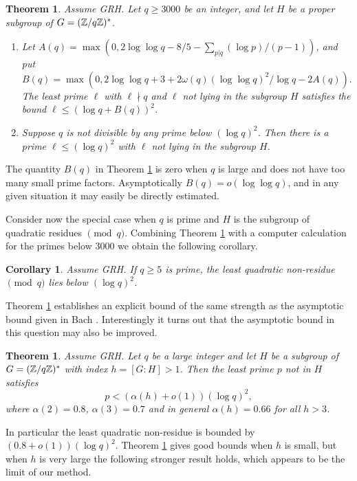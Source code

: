 \documentclass [12pt]{amsart}
\newtheorem{Theorem}[thm]{Theorem}
\newtheorem{corol}{Corollary}[section]
\numberwithin{equation}{section}
\begin{document}
 \begin{Theorem}\label{thmexplicit}
Assume GRH. Let $q\geq 3000$ be an integer, and let $H$ be a proper 
subgroup of $G=({\Bbb Z}/q{\Bbb Z})^*$.
\begin{enumerate}
\item Let $A(q) = \max(0, 2\log \log q -8/5 - \sum_{p|q} (\log p)/(p-1))$, and 
put $$B(q) = \max(0, 2\log \log q + 3 + 2\omega(q)(\log \log q)^2/\log q - 2A(q)).$$    The least prime $\ell$ with $\ell \nmid q$ and $\ell$ not lying 
in the subgroup $H$ satisfies the bound 
$\ell \le (\log q+ B(q))^2$.  
\item Suppose $q$ is not divisible by any prime below $(\log q)^2$.  
Then there is a prime $\ell \le (\log q)^2$ with $\ell$ not lying in the 
subgroup $H$.  
\end{enumerate}
\end{Theorem}
 
The quantity $B(q)$ in  Theorem \ref{thmexplicit} is zero when $q$ is large and 
does not have too many small prime factors.  Asymptotically $B(q)=o(\log \log q)$, and in any given situation it may easily be directly 
estimated.  
 
Consider now  the special case when $q$ is 
prime and $H$ is the subgroup of quadratic residues $\pmod q$.  
 Combining Theorem \ref{thmexplicit} with a computer calculation for the primes below $3000$ we 
obtain the following corollary. 

\begin{corol} 
\label{corexplicit}  Assume GRH.  If $q\ge 5$ is prime, the least quadratic non-residue $\pmod q$ 
lies below $(\log q)^2$. 
\end{corol}
 
Theorem \ref{thmexplicit} establishes an explicit bound of the same strength as 
the asymptotic bound given in Bach \cite{Bach1}.   Interestingly it turns out that the 
asymptotic bound in this question may also be improved.

\begin{Theorem}\label{thmtheoretical1}
Assume GRH.  Let $q$ be a large integer and let $H$ be a subgroup 
of $G=({\Bbb Z}/q{\Bbb Z})^*$ with index $h=[G:H]>1$.  Then the least prime $p$ not in $H$ satisfies 
$$p < (\alpha(h)+o(1))(\log q)^2,$$
where   $\alpha(2) = 0.8$, $\alpha(3) = 0.7$ and in general $\alpha(h) = 0.66$ for all $h>3$.  
\end{Theorem}
  
In particular the least quadratic non-residue is bounded by $(0.8+o(1))(\log q)^2$.   Theorem \ref{thmtheoretical1}  gives good bounds when $h$ is small, but when $h$ is very large the following stronger result holds, which appears 
to be the limit of our method.  
\end{document}
